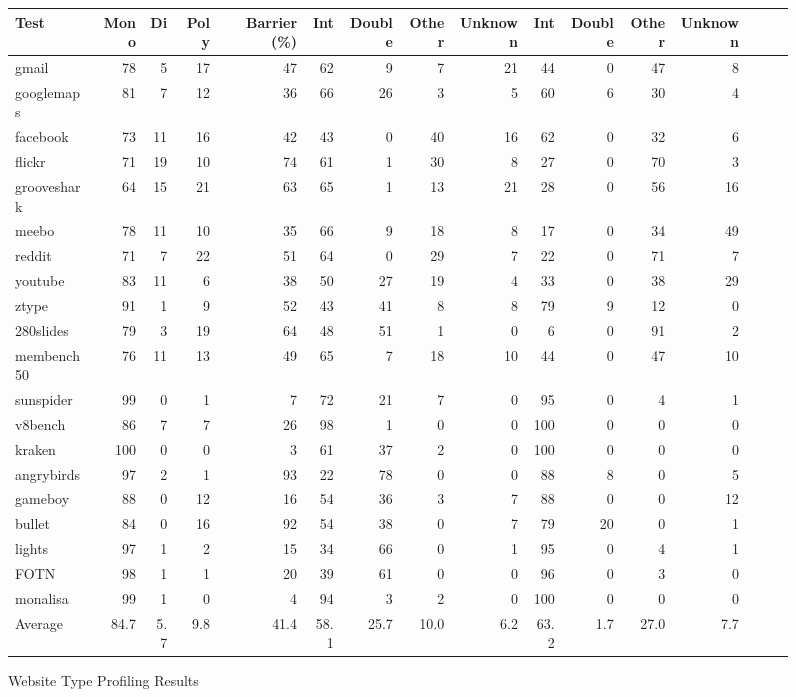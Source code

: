 \begin{figure*}
\begin{tabular}{lrrrrrrrrrrrrrrr}
Test
& Mono & Di & Poly & Barrier (\%)
& Int & Double & Other & Unknown
& Int & Double & Other & Unknown \\
\midrule
gmail          & 78 & 5  & 17 & 47 & 62 & 9  & 7  & 21 & 44 & 0 & 47 & 8 \\
googlemaps     & 81 & 7  & 12 & 36 & 66 & 26 & 3  & 5  & 60 & 6 & 30 & 4 \\
facebook       & 73 & 11 & 16 & 42 & 43 & 0 & 40 & 16 & 62 & 0 & 32 & 6 \\
flickr         & 71 & 19 & 10 & 74 & 61 & 1 & 30 & 8 & 27 & 0 & 70 & 3 \\
grooveshark    & 64 & 15 & 21 & 63 & 65 & 1 & 13 & 21 & 28 & 0 & 56 & 16 \\
meebo          & 78 & 11 & 10 & 35 & 66 & 9 & 18 & 8 & 17 & 0 & 34 & 49 \\
reddit         & 71 & 7 & 22 & 51 & 64 & 0 & 29 & 7 & 22 & 0 & 71 & 7 \\
youtube        & 83 & 11 & 6 & 38 & 50 & 27 & 19 & 4 & 33 & 0 & 38 & 29 \\
ztype          & 91 & 1 & 9 & 52 & 43 & 41 & 8 & 8 & 79 & 9 & 12 & 0 \\
280slides      & 79 & 3 & 19 & 64 & 48 & 51 & 1 & 0 & 6 & 0 & 91 & 2 \\
membench50     & 76 & 11 & 13 & 49 & 65 & 7  & 18 & 10 & 44 & 0 & 47 & 10 \\
\midrule
sunspider      & 99 & 0  & 1  & 7  & 72 & 21 & 7  & 0  & 95 & 0 & 4  & 1  \\
v8bench        & 86 & 7  & 7  & 26 & 98 & 1  & 0  & 0  & 100 & 0 & 0 & 0  \\
kraken         & 100 & 0 & 0  & 3  & 61 & 37 & 2  & 0  & 100 & 0 & 0 & 0  \\
\midrule
angrybirds     & 97 & 2 & 1 & 93 & 22 & 78 & 0 & 0 & 88 & 8 & 0 & 5 \\
gameboy        & 88 & 0 & 12 & 16 & 54 & 36 & 3 & 7 & 88 & 0 & 0 & 12 \\
bullet         & 84 & 0 & 16 & 92 & 54 & 38 & 0 & 7 & 79 & 20 & 0 & 1 \\
lights         & 97 & 1 & 2 & 15 & 34 & 66 & 0 & 1 & 95 & 0 & 4 & 1 \\
FOTN           & 98 & 1 & 1 & 20 & 39 & 61 & 0 & 0 & 96 & 0 & 3 & 0 \\
monalisa       & 99 & 1 & 0 & 4 & 94 & 3 & 2 & 0 & 100 & 0 & 0 & 0 \\
\midrule
Average        & 84.7 & 5.7 & 9.8 & 41.4 & 58.1 & 25.7 & 10.0 & 6.2 & 63.2 & 1.7 & 27.0 & 7.7 \\
\bottomrule
\end{tabular}
\nocaptionrule \caption{Website Type Profiling Results}
\label{fig:polymorphism}
\end{figure*}

